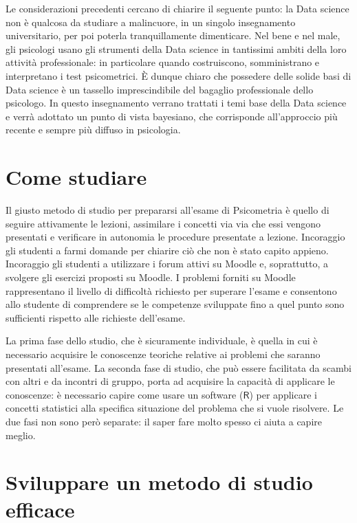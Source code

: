 \documentclass[
  11pt,
]{krantz}
\theoremstyle{definition}
\theoremstyle{definition}
\theoremstyle{definition}
\theoremstyle{definition}
\theoremstyle{remark}
\begin{document}
Le considerazioni precedenti cercano di chiarire il seguente punto: la Data science non è qualcosa da studiare a malincuore, in un singolo insegnamento universitario, per poi poterla tranquillamente dimenticare. Nel bene e nel male, gli psicologi usano gli strumenti della Data science in tantissimi ambiti della loro attività professionale: in particolare quando costruiscono, somministrano e interpretano i test psicometrici. È dunque chiaro che possedere delle solide basi di Data science è un tassello imprescindibile del bagaglio professionale dello psicologo. In questo insegnamento verrano trattati i temi base della Data science e verrà adottato un punto di vista bayesiano, che corrisponde all'approccio più recente e sempre più diffuso in psicologia.

\hypertarget{come-studiare}{%
\section*{Come studiare}\label{come-studiare}}


Il giusto metodo di studio per prepararsi all'esame di Psicometria è quello di seguire attivamente le lezioni, assimilare i concetti via via che essi vengono presentati e verificare in autonomia le procedure presentate a lezione. Incoraggio gli studenti a farmi domande per chiarire ciò che non è stato capito appieno. Incoraggio gli studenti a utilizzare i forum attivi su Moodle e, soprattutto, a svolgere gli esercizi proposti su Moodle. I problemi forniti su Moodle rappresentano il livello di difficoltà richiesto per superare l'esame e consentono allo studente di comprendere se le competenze sviluppate fino a quel punto sono sufficienti rispetto alle richieste dell'esame.

La prima fase dello studio, che è sicuramente individuale, è quella in cui è necessario acquisire le conoscenze teoriche relative ai problemi che saranno presentati all'esame. La seconda fase di studio, che può essere facilitata da scambi con altri e da incontri di gruppo, porta ad acquisire la capacità di applicare le conoscenze: è necessario capire come usare un software (\(\textsf{R}\)) per applicare i concetti statistici alla specifica situazione del problema che si vuole risolvere. Le due fasi non sono però separate: il saper fare molto spesso ci aiuta a capire meglio.

\hypertarget{sviluppare-un-metodo-di-studio-efficace}{%
\section*{Sviluppare un metodo di studio efficace}\label{sviluppare-un-metodo-di-studio-efficace}}
\end{document}
